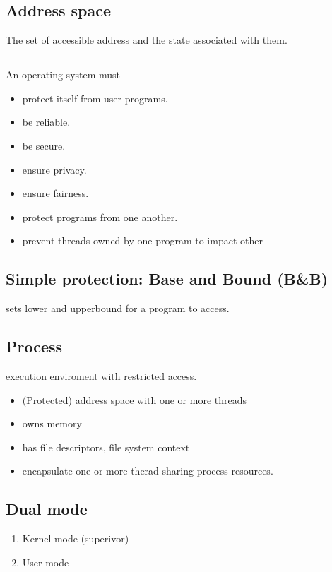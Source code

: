 \subsection{Address space}
The set of accessible address and the state associated with them.

\subsection{}
An operating system must 
\begin{itemize}
    \item protect itself from user programs.
    \item be reliable.
    \item be secure.
    \item ensure privacy.
    \item ensure fairness.
    \item protect programs from one another.
    \item prevent threads owned by one program to impact other
\end{itemize}
\subsection{Simple protection: Base and Bound (B\&B)}
sets lower and upperbound for a program to access.

\subsection{Process}
execution enviroment with restricted access. 
\begin{itemize}
    \item (Protected) address space with one or more threads
    \item owns memory
    \item has file descriptors, file system context
    \item encapsulate one or more therad sharing process resources.
\end{itemize}

\subsection{Dual mode}
\begin{enumerate}
    \item Kernel mode (superivor)
    \item User mode
\end{enumerate}